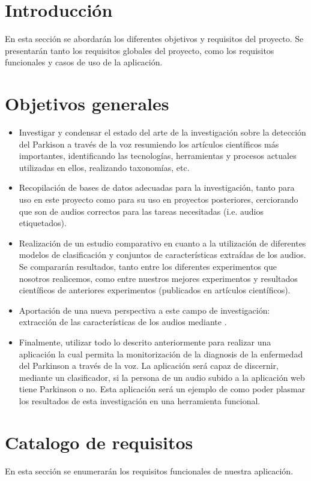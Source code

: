 
\section{Introducción}
En esta sección se abordarán los diferentes objetivos y requisitos del proyecto. Se presentarán tanto los requisitos globales del proyecto, como los requisitos funcionales y casos de uso de la aplicación.

\section{Objetivos generales}
\begin{itemize}
	\item Investigar y condensar el estado del arte de la investigación sobre la detección del Parkison a través de la voz resumiendo los artículos científicos más importantes, identificando las tecnologías, herramientas y procesos actuales utilizadas en ellos, realizando taxonomías, etc.
	\item Recopilación de bases de datos adecuadas para la investigación, tanto para uso en este proyecto como para su uso en proyectos posteriores, cerciorando que son  de audios correctos para las tareas necesitadas (i.e. audios etiquetados).
	\item Realización de un estudio comparativo en cuanto a la utilización de diferentes modelos de clasificación y conjuntos de características extraídas de los audios. Se compararán resultados, tanto entre los diferentes experimentos que nosotros realicemos, como entre nuestros mejores experimentos y resultados científicos de anteriores experimentos (publicados en artículos científicos).
	\item Aportación de una nueva perspectiva a este campo de investigación: extracción de las características de los audios mediante .
	\item Finalmente, utilizar todo lo descrito anteriormente para realizar una aplicación la cual permita la monitorización de la diagnosis de la enfermedad del Parkinson a través de la voz. La aplicación será capaz de discernir, mediante un clasificador, si la persona de un audio subido a la aplicación web tiene Parkinson o no. Esta aplicación será un ejemplo de como poder plasmar los resultados de esta investigación en una herramienta funcional.
\end{itemize}

\section{Catalogo de requisitos}
En esta sección se enumerarán los requisitos funcionales de nuestra aplicación.



